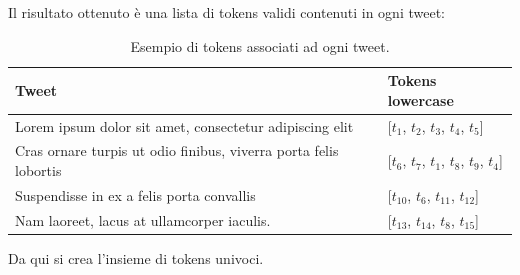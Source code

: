 \documentclass[oneside]{book}
\begin{document}
Il risultato ottenuto è una lista di tokens validi contenuti in ogni tweet:

\begin{table}[h!]
	\centering
	\begin{tabular}[t]{l|l}
		\hline
		\textbf{Tweet} & \textbf{Tokens lowercase}\\
		\hline
		Lorem ipsum dolor sit amet, consectetur adipiscing elit				& [$t_1$, $t_2$, $t_3$, $t_4$, $t_5$] \\
		Cras ornare turpis ut odio finibus, viverra porta felis lobortis 	& [$t_6$, $t_7$, $t_1$, $t_8$, $t_9$, $t_4$] \\
		Suspendisse in ex a felis porta convallis							& [$t_{10}$, $t_6$, $t_{11}$, $t_{12}$] \\
		Nam laoreet, lacus at ullamcorper iaculis.							& [$t_{13}$, $t_{14}$, $t_8$, $t_{15}$]\\
		
		\hline
	\end{tabular}
	\caption{Esempio di tokens associati ad ogni tweet.}
\end{table}
\noindent
Da qui si crea l'insieme di tokens univoci.
\end{document}
